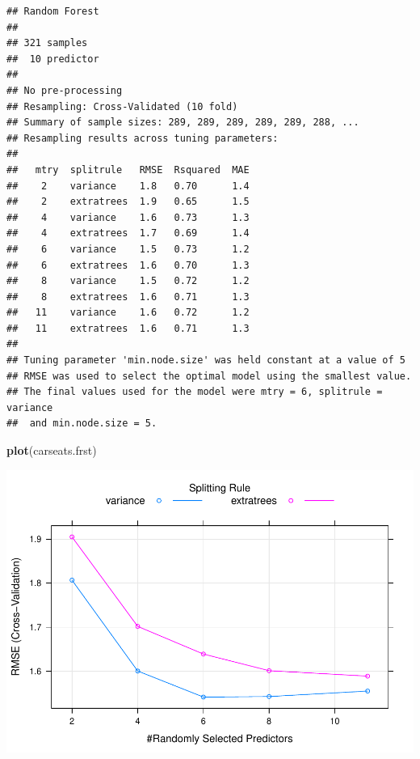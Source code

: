 \documentclass[
]{book}
\newenvironment{Shaded}{\begin{snugshade}}{\end{snugshade}}
\newcommand{\DataTypeTok}[1]{\textcolor[rgb]{0.13,0.29,0.53}{#1}}
\newcommand{\DecValTok}[1]{\textcolor[rgb]{0.00,0.00,0.81}{#1}}
\newcommand{\KeywordTok}[1]{\textcolor[rgb]{0.13,0.29,0.53}{\textbf{#1}}}
\newcommand{\NormalTok}[1]{#1}
\newcommand{\OperatorTok}[1]{\textcolor[rgb]{0.81,0.36,0.00}{\textbf{#1}}}
\newcommand{\StringTok}[1]{\textcolor[rgb]{0.31,0.60,0.02}{#1}}
\begin{document}
\begin{verbatim}
## Random Forest 
## 
## 321 samples
##  10 predictor
## 
## No pre-processing
## Resampling: Cross-Validated (10 fold) 
## Summary of sample sizes: 289, 289, 289, 289, 289, 288, ... 
## Resampling results across tuning parameters:
## 
##   mtry  splitrule   RMSE  Rsquared  MAE
##    2    variance    1.8   0.70      1.4
##    2    extratrees  1.9   0.65      1.5
##    4    variance    1.6   0.73      1.3
##    4    extratrees  1.7   0.69      1.4
##    6    variance    1.5   0.73      1.2
##    6    extratrees  1.6   0.70      1.3
##    8    variance    1.5   0.72      1.2
##    8    extratrees  1.6   0.71      1.3
##   11    variance    1.6   0.72      1.2
##   11    extratrees  1.6   0.71      1.3
## 
## Tuning parameter 'min.node.size' was held constant at a value of 5
## RMSE was used to select the optimal model using the smallest value.
## The final values used for the model were mtry = 6, splitrule = variance
##  and min.node.size = 5.
\end{verbatim}

\begin{Shaded}
\begin{Highlighting}[]
\KeywordTok{plot}\NormalTok{(carseats.frst)}
\end{Highlighting}
\end{Shaded}

\includegraphics{data-sci_files/figure-latex/unnamed-chunk-118-1.pdf}

\begin{Shaded}
\end{Shaded}
\end{document}
